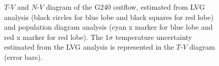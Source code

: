 \begin{figure}[htbp]
\centering
{}
\caption{$T$-$V$ and $N$-$V$ diagram of the G240 outflow, estimated from LVG analysis (black circles for blue lobe and black squares for red lobe) and population diagram analysis (cyan x marker for blue lobe and red x marker for red lobe). The 1$\sigma$ temperature uncertainty estimated from the LVG analysis is represented in the $T$-$V$ diagram (error bars). \label{fig4}}
\end{figure}

